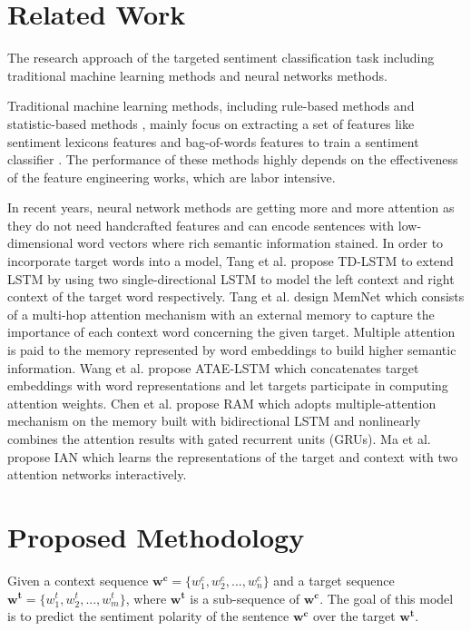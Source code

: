 \documentclass[11pt,a4paper]{article}
\begin{document}
\section{Related Work}

The research approach of the targeted sentiment classification task including traditional machine learning methods and neural networks methods.

Traditional machine learning methods, including rule-based methods \cite{ding2008holistic} and statistic-based methods \cite{jiang2011target}, mainly focus on extracting a set of features like sentiment lexicons features and bag-of-words features to train a sentiment classifier \cite{rao2009semi}.
The performance of these methods highly depends on the effectiveness of the feature engineering works, which are labor intensive.

In recent years, neural network methods are getting more and more attention as they do not need handcrafted features and can encode sentences with low-dimensional word vectors where rich semantic information stained.
In order to incorporate target words into a model,
Tang et al.  propose TD-LSTM to extend LSTM by using two single-directional LSTM to model the left context and right context of the target word respectively.
Tang et al.  design MemNet which consists of a multi-hop attention mechanism with an external memory to capture the importance of each context word concerning the given target. Multiple attention is paid to the memory represented by word embeddings to build higher semantic information.
Wang et al.  propose ATAE-LSTM which concatenates target embeddings with word representations and let targets participate in computing attention weights.
Chen et al.  propose RAM which adopts multiple-attention mechanism on the memory built with bidirectional LSTM and nonlinearly combines the attention results with gated recurrent units (GRUs).
Ma et al.  propose IAN which learns the representations of the target and context with two attention networks interactively.

\section{Proposed Methodology}

Given a context sequence $\mathbf{w^c} = \{w_1^c, w_2^c, ..., w_n^c\}$
and a target sequence $\mathbf{w^t} = \{w_1^t, w_2^t, ..., w_m^t\}$,
where $\mathbf{w^t}$ is a sub-sequence of $\mathbf{w^c}$.
The goal of this model is to predict the sentiment polarity of the
sentence $\mathbf{w^c}$ over the target $\mathbf{w^t}$.
\end{document}
